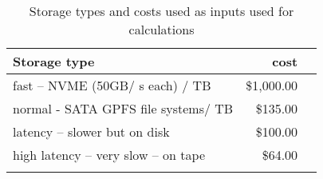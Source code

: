 \tiny \begin{longtable} { |p{}  |r  |r |} 
\caption{Storage types and costs used as inputs used for calculations \label{tab:Storage}}\\ 
\hline 
{Storage type }&{cost} \\ \hline
{fast -- NVME (50GB/ s each) / TB  }&{\$1,000.00} \\ \hline
{normal - SATA GPFS file systems/ TB  }&{\$135.00} \\ \hline
{latency -- slower but on disk }&{\$100.00} \\ \hline
{high latency -- very slow -- on tape }&{\$64.00} \\ \hline
{}&{} \\ \hline
\end{longtable} \normalsize
